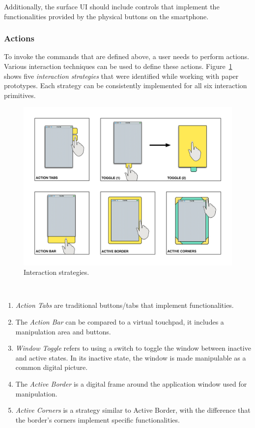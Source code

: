Additionally, the surface UI should include controls that implement the functionalities provided by the physical buttons on the smartphone.

\subsubsection{Actions}

To invoke the commands that are defined above, a user needs to perform actions.
Various interaction techniques can be used to define these actions.
Figure~\ref{strategies} shows five \emph{interaction strategies} that were identified while working with paper prototypes.
Each strategy can be consistently implemented for all six interaction primitives.

\begin{figure}[htb]
\centering
\includegraphics[width=1\linewidth]{images/strategies}
\caption{Interaction strategies.}
\label{strategies}
\end{figure}
\hfill\\
\begin{enumerate}
\item{\emph{Action Tabs} are traditional buttons/tabs that implement functionalities.}
\item{The \emph{Action Bar} can be compared to a virtual touchpad, it includes a manipulation area and buttons.}
\item{\emph{Window Toggle} refers to using a switch to toggle the window between inactive and active states. In its inactive state, the window is made manipulable as a common digital picture.}
\item{The \emph{Active Border} is a digital frame around the application window used for manipulation.}
\item{\emph{Active Corners} is a strategy similar to Active Border, with the difference that the border's corners implement specific functionalities.}
\end{enumerate}

